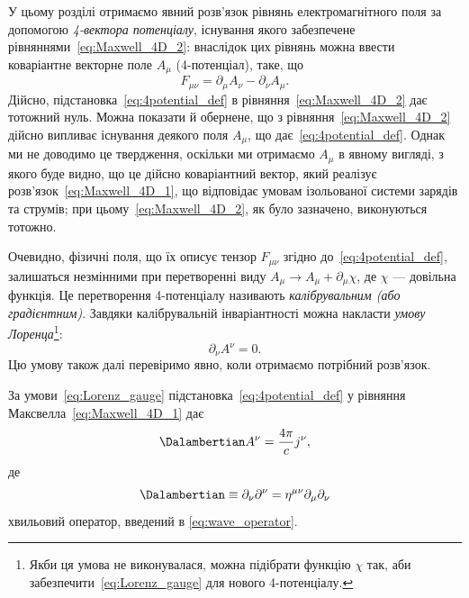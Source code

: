У цьому розділі отримаємо явний розв'язок рівнянь електромагнітного поля за допомогою \emph{4-вектора
    потенціалу}, існування якого забезпечене рівняннями~\eqref{eq:Maxwell_4D_2}: внаслідок
цих рівнянь можна ввести коваріантне векторне поле $A_{\mu}$ (4-потенціал), таке, що
\begin{equation}\label{eq:4potential_def}
    F_{\mu\nu} = \partial_{\mu}A_{\nu} - \partial_{\nu}A_{\mu}.
\end{equation}
Дійсно, підстановка~\eqref{eq:4potential_def} в рівняння~\eqref{eq:Maxwell_4D_2} дає тотожний нуль. Можна показати й
обернене, що з рівняння~\eqref{eq:Maxwell_4D_2} дійсно випливає існування деякого поля $A_{\mu}$, що
дає~\eqref{eq:4potential_def}. Однак ми не доводимо це твердження, оскільки ми отримаємо $A_{\mu}$ в явному вигляді, з
якого буде видно, що це дійсно коваріантний вектор, який реалізує розв'язок~\eqref{eq:Maxwell_4D_1}, що відповідає
умовам ізольованої системи зарядів та струмів; при цьому~\eqref{eq:Maxwell_4D_2}, як було зазначено, виконуються
тотожно.

Очевидно, фізичні поля, що їх описує тензор $F_{\mu\nu}$ згідно до~\eqref{eq:4potential_def}, залишаться незмінними при
перетворенні виду $A_{\mu}\to A_{\mu}+\partial_{\mu}\chi$, де $\chi$ --- довільна функція. Це перетворення 4-потенціалу
називають \emph{калібрувальним (або градієнтним)}. Завдяки калібрувальній
інваріантності можна накласти \emph{умову Лоренца}\footnote{Якби ця умова не виконувалася, можна підібрати функцію
    $\chi$ так, аби забезпечити~\eqref{eq:Lorenz_gauge} для нового 4-потенціалу.}:
\begin{equation}\label{eq:Lorenz_gauge}
    \partial_{\nu}A^{\nu} = 0.
\end{equation}
Цю умову також далі перевіримо явно, коли отримаємо потрібний розв'язок.

За умови~\eqref{eq:Lorenz_gauge} підстановка~\eqref{eq:4potential_def} у рівняння Максвелла~\eqref{eq:Maxwell_4D_1} дає
\begin{equation}\label{eq:wave_eq_A}
    \Dalambertian A^{\nu} = \frac{4\pi}{c}j^{\nu},
\end{equation}
де
\begin{equation}\label{eq:wave_operator_rel}
    \Dalambertian \equiv \partial_{\nu}\partial^{\nu} = \eta^{\mu\nu}\partial_{\mu}\partial_{\nu}
\end{equation}
хвильовий оператор, введений в \eqref{eq:wave_operator}.

